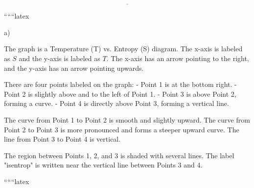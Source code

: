 \[
\underline{\hspace{5cm}}
\]

``````latex


a) 

The graph is a Temperature (T) vs. Entropy (S) diagram. The x-axis is labeled as \( S \) and the y-axis is labeled as \( T \). The x-axis has an arrow pointing to the right, and the y-axis has an arrow pointing upwards.

There are four points labeled on the graph:
- Point 1 is at the bottom right.
- Point 2 is slightly above and to the left of Point 1.
- Point 3 is above Point 2, forming a curve.
- Point 4 is directly above Point 3, forming a vertical line.

The curve from Point 1 to Point 2 is smooth and slightly upward. The curve from Point 2 to Point 3 is more pronounced and forms a steeper upward curve. The line from Point 3 to Point 4 is vertical.

The region between Points 1, 2, and 3 is shaded with several lines. The label "isentrop" is written near the vertical line between Points 3 and 4.

``````latex


